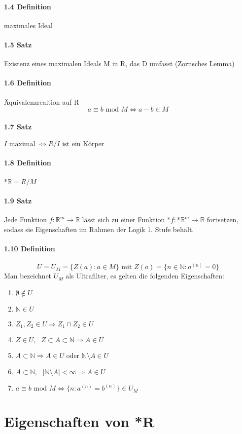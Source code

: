 \documentclass[a4paper]{article}
\begin{document}
\paragraph{1.4 Definition} maximales Ideal

\paragraph{1.5 Satz} Existenz eines maximalen Ideals M in R, das D umfasst (Zornsches Lemma)


\paragraph{1.6 Definition} Äquivalenzrealtion auf R  %
$$ a \equiv b \text{ mod } M \iff a - b \in M $$

\paragraph{1.7 Satz} $ I \text{ maximal } \iff R/I  \text{ ist ein Körper} $

\paragraph{1.8 Definition}  *$\mathbb{R} = R/M $

\paragraph{1.9 Satz} 
Jede Funktion $f:\mathbb{R}^m \to \mathbb{R} $ lässt sich zu einer 
Funktion *$f:$*$\mathbb{R}^m \to \mathbb{R}$ fortsetzen, sodass sie Eigenschaften im Rahmen 
der Logik 1. Stufe behält.

\paragraph{1.10 Definition}  
$$ U = U_M = \{Z(a): a \in M\} \text{ mit } Z(a) = \{n \in \mathbb{N}: a^{(n)} = 0\} $$
Man bezeichnet $ U_M $ als Ultrafilter, es gelten die folgenden Eigenschaften: 
\begin{enumerate}
      \item $ \emptyset \notin U $      
      \item $ \mathbb{N} \in U$ 
      \item $ Z_1, Z_2 \in U \Rightarrow Z_1 \cap Z_2 \in U$ 
      \item $ Z \in U, \text{ } Z \subset A \subset \mathbb{N} \Rightarrow A \in U$ 
      \item $ A \subset  \mathbb{N} \Rightarrow A \in U \text{ oder } \mathbb{N} \setminus A \in U$ 
      \item $ A \subset  \mathbb{N}, \text{ } |\mathbb{N} \setminus A| < \infty \Rightarrow A \in U$ 
      \item $a \equiv b \text{ mod } M \iff \{n: a^{(n)} = b^{(n)}\} \in U_M$
\end{enumerate}


\section{Eigenschaften von *R}
\end{document}
